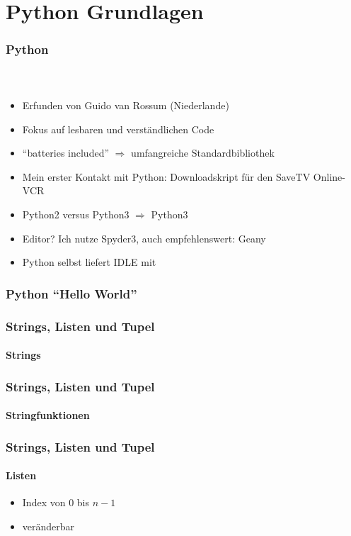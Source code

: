 \documentclass[12pt,ngerman]{beamer}
\begin{document}
\section{Python Grundlagen}

\begin{frame}
\frametitle{Python}
\framesubtitle{~}

\begin{itemize}
	\item Erfunden von Guido van Rossum (Niederlande)
	\item Fokus auf lesbaren und verständlichen Code
	\item \enquote{batteries included} $\Rightarrow$ umfangreiche Standardbibliothek
	\item Mein erster Kontakt mit Python: Downloadskript für den SaveTV Online-VCR
	\item Python2 versus Python3 $\Rightarrow$ Python3
	\item Editor? Ich nutze Spyder3, auch empfehlenswert: Geany
	\item Python selbst liefert IDLE mit
\end{itemize}
\end{frame}

\begin{frame}[fragile]
\frametitle{Python \enquote{Hello World}}



\end{frame}


\begin{frame}[fragile]
\frametitle{Strings, Listen und Tupel}
\framesubtitle{Strings}



\end{frame}

\begin{frame}[fragile]
\frametitle{Strings, Listen und Tupel}
\framesubtitle{Stringfunktionen}


\end{frame}


\begin{frame}[fragile]
\frametitle{Strings, Listen und Tupel}
\framesubtitle{Listen}

\begin{itemize}
	\item Index von $0$ bis $n-1$
	\item veränderbar
\end{itemize}



\end{frame}
\end{document}
